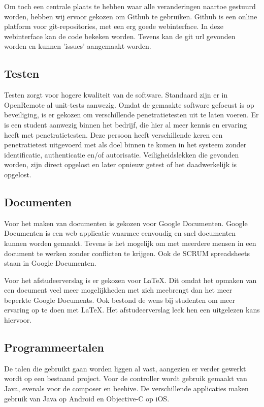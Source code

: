 \documentclass[]{article}
\begin{document}
Om toch een centrale plaats te hebben waar alle veranderingen naartoe
gestuurd worden, hebben wij ervoor gekozen om Github te gebruiken. Github
is een online platform voor git-repositories, met een erg goede
webinterface. In deze webinterface kan de code bekeken worden. Tevens kan de git url
gevonden worden en kunnen 'issues' aangemaakt worden.

\subsection{Testen}
Testen zorgt voor hogere kwaliteit van de
software. Standaard zijn er in OpenRemote al unit-tests aanwezig. Omdat de
gemaakte software gefocust is op beveiliging, is er gekozen om verschillende
penetratietesten uit te laten voeren. Er is een student aanwezig binnen het bedrijf, die hier al meer
kennis en ervaring heeft met penetratietesten. Deze persoon heeft verschillende keren een
penetratietest uitgevoerd met als doel binnen te komen in het systeem zonder
identificatie, authenticatie en/of autorisatie. Veiligheidslekken die gevonden
worden, zijn direct opgelost en later opnieuw getest of het daadwerkelijk is
opgelost.

\subsection{Documenten}
Voor het maken van documenten is gekozen voor Google Documenten.
Google Documenten is een web applicatie waarmee eenvoudig en
snel documenten kunnen worden gemaakt. Tevens is het mogelijk om met
meerdere mensen in een document te werken zonder conflicten te krijgen. Ook
de SCRUM spreadsheets staan in Google Documenten.

Voor het afstudeerverslag is er gekozen voor \LaTeX. Dit omdat het opmaken
van een document veel meer mogelijkheden met zich meebrengt dan het meer
beperkte Google Documents. Ook bestond de wens bij studenten
om meer ervaring op te doen met \LaTeX\space. Het afstudeerverslag leek hen een uitgelezen kans hiervoor.

\subsection{Programmeertalen}
De talen die gebruikt gaan worden liggen al vast, aangezien er verder 
gewerkt wordt op een bestaand project. Voor de controller wordt gebruik gemaakt van
Java, evenals voor de composer en beehive. De verschillende applicaties maken gebruik
van Java op Android en Objective-C op iOS.
\end{document}
